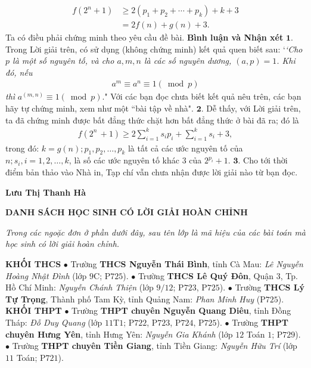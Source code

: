 \begin{multicols}{2}
	\begin{align*}
		f\left( {{2^n} + 1} \right) &\ge 2\left( {{p_1} + {p_2} +  \cdots  + {p_k}} \right) + k + 3 \\
		&= 2f\left( n \right) + g\left( n \right) + 3.
	\end{align*}
	Ta có điều phải chứng minh theo yêu cầu đề bài.
	\vskip 0.05cm
	\textbf{\color{thachthuctoanhoc}Bình luận và Nhận xét}
	\vskip 0.05cm
	$\pmb{1.}$ Trong Lời giải trên, có sử dụng (không chứng minh) kết quả quen biết sau:
	\vskip 0.05cm
	`\textit{`Cho $p$ là một số nguyên tố, và cho $a, m, n$ là các số nguyên dương, $(a,p)=1$. Khi đó, nếu
	\begin{align*}
		{a^m} \equiv {a^n} \equiv 1\left( {\bmod p} \right)
	\end{align*}
	thì}  ${a^{\left( {m,n} \right)}} \equiv 1\left( {\bmod p} \right).$"
	\vskip 0.05cm
	Với các bạn đọc chưa biết kết quả nêu trên, các bạn hãy tự chứng minh, xem như một ``bài tập về nhà".
	\vskip 0.05cm
	$\pmb{2.}$ Dễ thấy, với Lời giải trên, ta đã chứng minh được bất đẳng thức chặt hơn bất đẳng thức ở bài đã ra; đó là
	\begin{align*}
		f\left( {{2^n}\, + 1} \right) \ge 2\sum\limits_{i = 1}^k {{s_i}{p_i}}  + \sum\limits_{i = 1}^k {{s_i}}  + 3,
	\end{align*}
	trong đó: $k = g(n); p_1, p_2,\ldots,p_k$  là tất cả các ước nguyên tố của $n; s_i,  i = 1, 2, \ldots, k$, là số các ước nguyên tố khác $3$ của ${2^{{p_i}}} + 1.$
	\vskip 0.05cm
	$\pmb{3.}$ Cho tới thời điểm bản thảo vào Nhà in, Tạp chí vẫn chưa nhận được lời giải nào từ bạn đọc.
	\begin{flushright}
		\textbf{\color{thachthuctoanhoc}Lưu Thị Thanh Hà}
	\end{flushright}
\end{multicols}
\begin{center}
	\textbf{\color{thachthuctoanhoc}DANH SÁCH HỌC SINH CÓ LỜI GIẢI HOÀN CHỈNH}
\end{center}
\textit{Trong các ngoặc đơn ở phần dưới đây, sau tên lớp là mã hiệu của các bài toán mà học sinh có lời giải hoàn chỉnh.}
\begin{multicols}{2}
	\textbf{\color{thachthuctoanhoc}KHỐI THCS}
	\vskip 0.05cm
	$\bullet$ Trường \textbf{\color{thachthuctoanhoc}THCS Nguyễn Thái Bình}, tỉnh Cà Mau: \textit{Lê Nguyễn Hoàng Nhật Đình} (lớp $9$C; P$725$).
	\vskip 0.05cm
	$\bullet$ Trường \textbf{\color{thachthuctoanhoc}THCS Lê Quý Đôn}, Quận $3$, Tp. Hồ Chí Minh: \textit{Nguyễn Chánh Thiện} (lớp $9/12$; P$723$, P$725$).
	\vskip 0.05cm
	$\bullet$ Trường \textbf{\color{thachthuctoanhoc}THCS Lý Tự Trọng}, Thành phố Tam Kỳ, tỉnh Quảng Nam: \textit{Phan Minh Huy} (P$725$).
	\vskip 0.05cm
	\textbf{\color{thachthuctoanhoc}KHỐI THPT}
	\vskip 0.05cm
	$\bullet$ Trường \textbf{\color{thachthuctoanhoc}THPT chuyên Nguyễn Quang Diêu}, tỉnh Đồng Tháp: \textit{Đỗ Duy Quang} (lớp $11$T$1$; P$722$, P$723$, P$724$, P$725$).
	\vskip 0.05cm
	$\bullet$ Trường \textbf{\color{thachthuctoanhoc}THPT chuyên Hưng Yên}, tỉnh Hưng Yên: \textit{Nguyễn Gia Khánh} (lớp $12$ Toán $1$; P$729$).
	\vskip 0.05cm
	$\bullet$ Trường \textbf{\color{thachthuctoanhoc}THPT chuyên Tiền Giang}, tỉnh Tiền Giang: \textit{Nguyễn Hữu Trí} (lớp $11$ Toán; P$721$).
\end{multicols}
